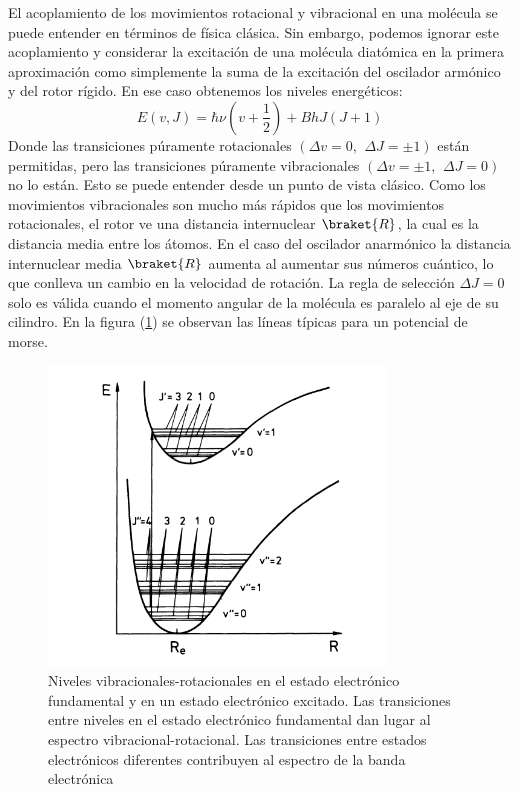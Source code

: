 \documentclass[a4paper]{article}
\begin{document}
El acoplamiento de los movimientos rotacional y vibracional en una molécula se puede entender en términos de física clásica. Sin embargo, podemos ignorar este acoplamiento y considerar la excitación de una molécula diatómica en la primera aproximación como simplemente la suma de la excitación del oscilador armónico y del rotor rígido. En ese caso obtenemos los niveles energéticos:
\begin{equation}
E(v,J)=\hbar\nu(v+\frac{1}{2})+ BhJ(J+1)
\end{equation}
Donde  las transiciones púramente rotacionales $(\Delta v = 0, \,\ \Delta J = \pm 1)$ están permitidas, pero las transiciones púramente vibracionales $(\Delta v = \pm 1, \,\ \Delta J = 0)$ no lo están. Esto se puede entender desde un punto de vista clásico. Como los movimientos vibracionales son mucho más rápidos que los movimientos rotacionales, el rotor ve una distancia internuclear $\braket{R}$, la cual es la distancia media entre los átomos. En el caso del oscilador anarmónico la distancia internuclear media $\braket{R}$ aumenta al aumentar sus números cuántico, lo que conlleva un cambio en la velocidad de rotación. La regla de selección $\Delta J=0$ solo es válida cuando el momento angular de la molécula es paralelo al eje de su cilindro.
En la figura (\ref{transiciones}) se observan las líneas típicas para un potencial de morse.
\begin{figure}
\includegraphics[width=0.8\textwidth]{niv_rot_vib_elect.png}
\caption{Niveles vibracionales-rotacionales en el estado electrónico fundamental y en un estado electrónico excitado. Las transiciones entre niveles en el estado electrónico fundamental dan lugar al espectro vibracional-rotacional. Las transiciones entre estados electrónicos diferentes contribuyen al espectro de la banda electrónica}
\label{transiciones}
\end{figure}
\newpage
\printbibliography
\end{document}
